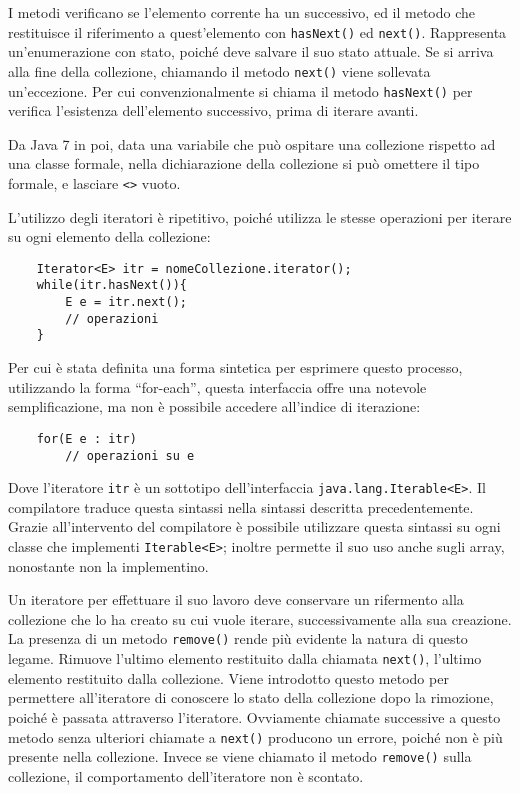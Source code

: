 \documentclass{article}
\numberwithin{equation}{subsection}
\begin{document}
I metodi verificano se l'elemento corrente ha un successivo, ed il metodo che restituisce il riferimento a quest'elemento con \verb|hasNext()| ed \verb|next()|. 
Rappresenta un'enumerazione con stato, poiché deve salvare il suo stato attuale. Se si arriva alla fine della collezione, chiamando il metodo \verb|next()| viene 
sollevata un'eccezione. Per cui convenzionalmente si chiama il metodo \verb|hasNext()| per verifica l'esistenza dell'elemento successivo, prima di iterare avanti. 

Da Java 7 in poi, data una variabile che può ospitare una collezione rispetto ad una classe formale, nella dichiarazione della collezione si può omettere il tipo formale, e 
lasciare \verb|<>| vuoto. 

L'utilizzo degli iteratori è ripetitivo, poiché utilizza le stesse operazioni per iterare su ogni elemento della collezione:
\begin{verbatim}
    Iterator<E> itr = nomeCollezione.iterator();
    while(itr.hasNext()){
        E e = itr.next();
        // operazioni
    }
\end{verbatim}

Per cui è stata definita una forma sintetica per esprimere questo processo, utilizzando la forma ``for-each'', questa interfaccia offre una notevole semplificazione, ma non 
è possibile accedere all'indice di iterazione:
\begin{verbatim}
    for(E e : itr)
        // operazioni su e
\end{verbatim}
Dove l'iteratore \verb|itr| è un sottotipo dell'interfaccia \verb|java.lang.Iterable<E>|. Il compilatore traduce questa sintassi nella sintassi descritta precedentemente. 
Grazie all'intervento del compilatore è possibile utilizzare questa sintassi su ogni classe che implementi \verb|Iterable<E>|; inoltre permette il suo uso anche sugli array, 
nonostante non la implementino. 

Un iteratore per effettuare il suo lavoro deve conservare un rifermento alla collezione che lo ha creato su cui vuole iterare, successivamente alla sua creazione. 
La presenza di un metodo \verb|remove()| rende più evidente la natura di questo legame. Rimuove l'ultimo elemento restituito dalla chiamata \verb|next()|, l'ultimo 
elemento restituito dalla collezione. Viene introdotto questo metodo per permettere all'iteratore di conoscere lo stato della collezione dopo la rimozione, poiché è 
passata attraverso l'iteratore. 
Ovviamente chiamate successive a questo metodo senza ulteriori chiamate a \verb|next()| producono un errore, poiché non è più presente nella collezione. Invece se viene chiamato il metodo 
\verb|remove()| sulla collezione, il comportamento dell'iteratore non è scontato. 
\end{document}
